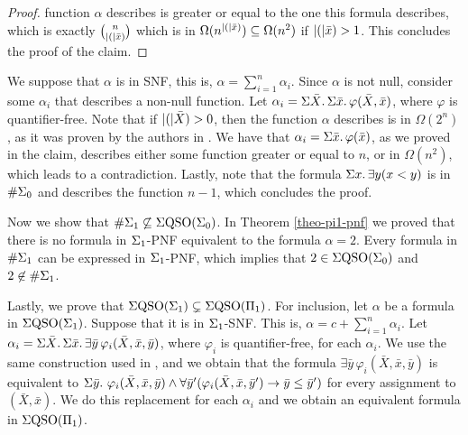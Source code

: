 \begin{proof}
function $\alpha$ describes is greater or equal to the one this formula describes, which is exactly $\binom{n}{\vert ( \vert\bar{x})}$ which is in $\Omega(n^{\vert ( \vert\bar{x})}) \subseteq \Omega(n^2)$ if $\vert ( \vert\bar{x}) > 1$. This concludes the proof of the claim.
\end{proof}
We suppose that $\alpha$ is in SNF, this is, $\alpha = \sum_{i = 1}^n\alpha_i$. Since $\alpha$ is not null, consider some $\alpha_i$ that describes a non-null function. Let $\alpha_i = \Sigma{\bar{X}}.\,\Sigma{\bar{x}}.\,\varphi(\bar{X},\bar{x})$, where $\varphi$ is quantifier-free. Note that if $\vert ( \vert\bar{X}) > 0$, then the function $\alpha$ describes is in $\Omega(2^n)$, as it was proven by the authors in \cite{SalujaST95}. We have that $\alpha_i = \Sigma{\bar{x}}.\,\varphi(\bar{x})$, as we proved in the claim, describes either some function greater or equal to $n$, or in $\Omega(n^2)$, which leads to a contradiction. Lastly, note that the formula $\Sigma{x}.\,\exists y(x < y)$ is in $\#\Sigma_{0}$ and describes the function $n-1$, which concludes the proof.

\vspace{1em}
Now we show that $\#\Sigma_{1}\not\subseteq\Sigma{\rm QSO}(\Sigma_{0})$. In Theorem \ref{theo-pi1-pnf} we proved that there is no formula in $\Sigma_{1}$-PNF equivalent to the formula $\alpha = 2$. Every formula in $\#\Sigma_{1}$ can be expressed in $\Sigma_{1}$-PNF, which implies that $2 \in \Sigma{\rm QSO}(\Sigma_{0})$ and $2 \not\in \#\Sigma_{1}$.

\vspace{1em}
Lastly, we prove that $\Sigma{\rm QSO}(\Sigma_{1})\subsetneq\Sigma{\rm QSO}(\Pi_{1})$. For inclusion, let $\alpha$ be a formula in $\Sigma{\rm QSO}(\Sigma_{1})$. Suppose that it is in $\Sigma_{1}$-SNF. This is, $\alpha = c + \sum_{i = 1}^{n}\alpha_i$. Let $\alpha_i = \Sigma{\bar{X}}.\,\Sigma{\bar{x}}.\,\exists\bar{y}\,\varphi_i(\bar{X},\bar{x},\bar{y})$, where $\varphi_i$ is quantifier-free, for each $\alpha_i$. We use the same construction used in \cite{SalujaST95}, and we obtain that the formula $\exists\bar{y}\,\varphi_i(\bar{X},\bar{x},\bar{y})$ is equivalent to $\Sigma{\bar{y}}.\,\,\varphi_i(\bar{X},\bar{x},\bar{y}) \wedge \forall\bar{y}'(\varphi_i(\bar{X},\bar{x},\bar{y}')\to\bar{y}\leq\bar{y}')$ for every assignment to $(\bar{X},\bar{x})$. We do this replacement for each $\alpha_i$ and we obtain an equivalent formula in $\Sigma{\rm QSO}(\Pi_{1})$.


